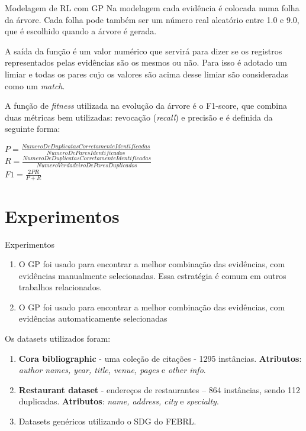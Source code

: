 \documentclass{beamer}
\begin{document}
  \begin{frame}{Modelagem de RL com GP}
      Na modelagem cada evidência é colocada numa folha da árvore. Cada folha pode também ser um número real aleatório entre 1.0 e 9.0, que é escolhido quando a árvore é gerada.

      A saída da função é um valor numérico que servirá para dizer se os registros representados pelas evidências são os mesmos ou não. Para isso é adotado um limiar e todas os pares cujo os valores são acima desse limiar são consideradas como um \textit{match}.

      A função de \textit{fitness} utilizada na evolução da árvore é o F1-score, que combina duas métricas bem utilizadas: revocação (\textit{recall}) e precisão e é definida da seguinte forma:

      \begin{center}
          $P = \frac{NumeroDeDuplicatasCorretamenteIdentificadas}{NumeroDeParesIdentificados}$ \\
          $R = \frac{NumeroDeDuplicatasCorretamenteIdentificadas}{NumeroVerdadeiroDeParesDuplicados}$ \\
          $F1 = \frac{2PR}{P+R}$ \\
      \end{center}
  \end{frame}

  \section{Experimentos}

  \begin{frame}{Experimentos}
      \begin{enumerate}
          \item O GP foi usado para encontrar a melhor combinação das evidências, com evidências manualmente selecionadas. Essa estratégia é comum em outros trabalhos relacionados.
          \item O GP foi usado para encontrar a melhor combinação das evidências, com evidências automaticamente selecionadas
      \end{enumerate}

      Os datasets utilizados foram:
      \begin{enumerate}
          \item \textbf{Cora bibliographic} - uma coleção de citações - 1295 instâncias. \textbf{Atributos}: \textit{author names, year, title, venue, pages} e \textit{other info}.
          \item \textbf{Restaurant dataset} - endereços de restaurantes -- 864 instâncias, sendo 112 duplicadas. \textbf{Atributos}: \textit{name, address, city} e \textit{specialty}.
          \item Datasets genéricos utilizando o SDG do FEBRL.
      \end{enumerate}
  \end{frame}
\end{document}

